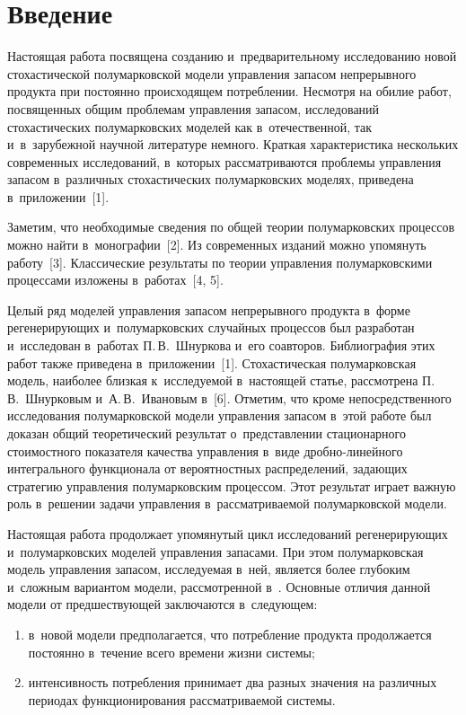 
\thispagestyle{headings}

\begin{multicols}{2}

\label{st\stat}

\section{Введение}

  Настоящая работа посвящена созданию и~предварительному исследованию 
новой стохастической полумарковской модели управления запасом 
непрерывного продукта при постоянно происходящем потреблении. Несмотря 
на обилие работ, посвященных общим проблемам управления запасом, 
исследований стохастических полумарковских моделей как в~отечественной, 
так и~в~зарубежной научной литературе немного. Краткая характеристика 
нескольких современных исследований, в~которых рассматриваются проблемы 
управления запасом в~различных стохастических полумарковских моделях, 
приведена в~приложении~[1]. 
  
  Заметим, что необходимые сведения по общей теории полумарковских 
процессов можно найти в~монографии~[2]. Из современных изданий можно 
упомянуть работу~[3]. Классические результаты по теории управления 
полумарковскими процессами изложены в~работах~[4, 5].
  
  Целый ряд моделей управления запасом непрерывного продукта в~форме 
регенерирующих и~полумарковских случайных процессов был разработан 
и~исследован в~работах П.\,В.~Шнуркова и~его соавторов. Библиография этих 
работ также приведена в~приложении~[1]. Стохастическая полумарковская 
модель, наиболее близкая к~исследуемой в~настоящей статье, рассмотрена 
П.\,В.~Шнурковым и~А.\,В.~Ивановым в~[6]. Отметим, что кроме 
непосредственного исследования полумарковской модели управ\-ле\-ния запасом 
в~этой работе был доказан общий теоретический результат о~пред\-став\-ле\-нии 
стационарного стоимостного показателя качества управ\-ле\-ния в~виде  
дроб\-но-ли\-ней\-но\-го интегрального функционала от вероятностных 
распределений, задающих стратегию управления полумарковским процессом. 
Этот результат играет важную роль в~решении задачи управления 
в~рассматриваемой полумарковской модели.
  
  Настоящая работа продолжает упомянутый цикл исследований 
регенерирующих и~полумарковских моделей управления запасами. При этом 
полумарковская модель управления запасом, исследуемая в~ней, является более 
глубоким и~сложным вариантом модели, рассмотренной в~\cite{6-sh}. 
Основные отличия данной модели от предшествующей заключаются 
в~следующем:
  \begin{enumerate}[(1)]
  \item  в~новой модели предполагается, что потребление продукта 
продолжается постоянно в~течение всего времени жизни системы;
  \item интенсивность потребления принимает два разных значения на 
различных периодах функционирования рассматриваемой системы.
  \end{enumerate}
  

\end{multicols}
